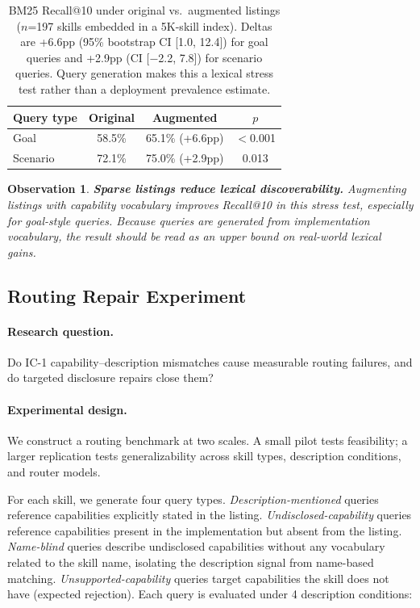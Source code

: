 \documentclass[11pt]{article}
\newtheorem{observation}{Observation}
\begin{document}
\begin{table}[t]
\centering\small
\begin{tabular}{lccc}
\toprule
\textbf{Query type} & \textbf{Original} & \textbf{Augmented} & \textbf{$p$} \\
\midrule
Goal     & 58.5\% & 65.1\% (+6.6pp) & $<$0.001 \\
Scenario & 72.1\% & 75.0\% (+2.9pp) & 0.013 \\
\bottomrule
\end{tabular}
\caption{BM25 Recall@10 under original vs.\ augmented
listings ($n$=197 skills embedded in a 5K-skill index).
Deltas are +6.6pp (95\% bootstrap CI [1.0, 12.4])
for goal queries and +2.9pp (CI [$-$2.2, 7.8]) for scenario
queries. Query generation makes this a lexical
stress test rather than a deployment prevalence estimate.}
\label{tab:bm25}
\end{table}

\begin{observation}
\textbf{Sparse listings reduce lexical discoverability.}
Augmenting listings with capability vocabulary improves
Recall@10 in this stress test, especially for goal-style
queries. Because queries are generated from implementation
vocabulary, the result should be read as an upper bound on
real-world lexical gains.
\end{observation}

\subsection{Routing Repair Experiment}
\label{subsec:routing_gap}

\paragraph{Research question.}
Do IC-1 capability--description mismatches cause
measurable routing failures, and do targeted disclosure
repairs close them?

\paragraph{Experimental design.}
We construct a routing benchmark at two scales.
A small pilot tests feasibility; a larger replication
tests generalizability across skill types, description
conditions, and router models.

For each skill, we generate four query types.
\emph{Description-mentioned} queries reference capabilities
explicitly stated in the listing.
\emph{Undisclosed-capability} queries reference capabilities
present in the implementation but absent from the listing.
\emph{Name-blind} queries describe undisclosed capabilities
without any vocabulary related to the skill name,
isolating the description signal from name-based matching.
\emph{Unsupported-capability} queries target capabilities
the skill does not have (expected rejection).
Each query is evaluated under 4 description conditions:
\end{document}
